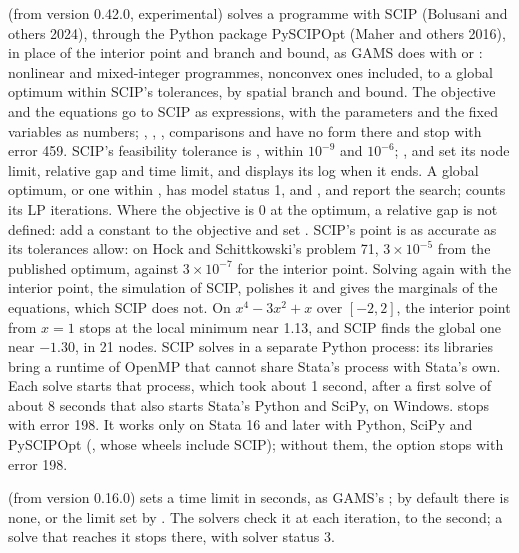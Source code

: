 \begin{optdesc}
\item[\optarg{sol}{ver}{scip}] (from version 0.42.0, experimental) solves a
programme with SCIP (Bolusani and others 2024), through the Python package
PySCIPOpt (Maher and others 2016), in place of the interior point and branch
and bound, as GAMS does with  or : nonlinear and mixed-integer programmes, nonconvex ones included, to a
global optimum within SCIP's tolerances, by spatial branch and bound. The
objective and the equations go to SCIP as expressions, with the parameters
and the fixed variables as numbers; , ,
, comparisons and  have no form there and stop with
error 459. SCIP's feasibility tolerance is , within
$10^{-9}$ and $10^{-6}$; ,  and
 set its node limit, relative gap and time limit, and
 displays its log when it ends. A global optimum, or one within
, has model status 1, and , 
and  report the search;  counts its LP
iterations. Where the objective is 0 at the optimum, a relative gap is not
defined: add a constant to the objective and set . SCIP's point
is as accurate as its tolerances allow: on Hock and Schittkowski's problem
71, $3\times10^{-5}$ from the published optimum, against $3\times10^{-7}$
for the interior point. Solving again with the interior point,
 the simulation of SCIP, polishes it and gives the marginals of
the equations, which SCIP does not. On $x^4 - 3x^2 + x$ over $[-2, 2]$, the
interior point from $x = 1$ stops at the local minimum near 1.13, and SCIP
finds the global one near $-1.30$, in 21 nodes. SCIP solves in a separate
Python process: its libraries bring a runtime of OpenMP that cannot share
Stata's process with Stata's own. Each solve starts that process, which took
about 1 second, after a first solve of about 8 seconds that also starts
Stata's Python and SciPy, on Windows.  stops with error 198. It
works only on Stata 16 and later with Python, SciPy and PySCIPOpt
(, whose wheels include SCIP); without them, the
option stops with error 198.

\item[\optarg{time}{limit}{\#}] (from version 0.16.0) sets a time limit in
seconds, as GAMS's ; by default there is none, or the limit set by
. The solvers check it at each iteration, to the second; a
solve that reaches it stops there, with solver status 3.


\end{optdesc}
